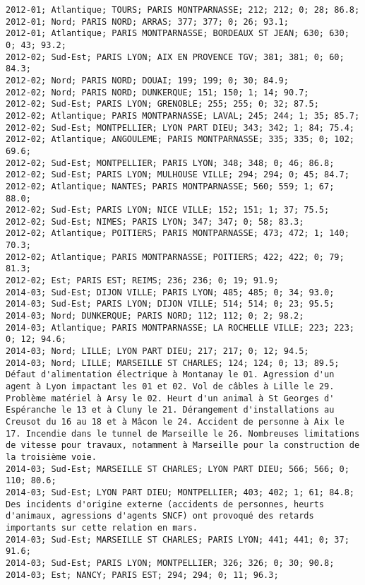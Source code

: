 \documentclass{article}
\begin{document}
\begin{Verbatim}[commandchars=\\\{\}]
2012-01; Atlantique; TOURS; PARIS MONTPARNASSE; 212; 212; 0; 28; 86.8; 
2012-01; Nord; PARIS NORD; ARRAS; 377; 377; 0; 26; 93.1; 
2012-01; Atlantique; PARIS MONTPARNASSE; BORDEAUX ST JEAN; 630; 630; 0; 43; 93.2; 
2012-02; Sud-Est; PARIS LYON; AIX EN PROVENCE TGV; 381; 381; 0; 60; 84.3; 
2012-02; Nord; PARIS NORD; DOUAI; 199; 199; 0; 30; 84.9; 
2012-02; Nord; PARIS NORD; DUNKERQUE; 151; 150; 1; 14; 90.7; 
2012-02; Sud-Est; PARIS LYON; GRENOBLE; 255; 255; 0; 32; 87.5; 
2012-02; Atlantique; PARIS MONTPARNASSE; LAVAL; 245; 244; 1; 35; 85.7; 
2012-02; Sud-Est; MONTPELLIER; LYON PART DIEU; 343; 342; 1; 84; 75.4; 
2012-02; Atlantique; ANGOULEME; PARIS MONTPARNASSE; 335; 335; 0; 102; 69.6; 
2012-02; Sud-Est; MONTPELLIER; PARIS LYON; 348; 348; 0; 46; 86.8; 
2012-02; Sud-Est; PARIS LYON; MULHOUSE VILLE; 294; 294; 0; 45; 84.7; 
2012-02; Atlantique; NANTES; PARIS MONTPARNASSE; 560; 559; 1; 67; 88.0; 
2012-02; Sud-Est; PARIS LYON; NICE VILLE; 152; 151; 1; 37; 75.5; 
2012-02; Sud-Est; NIMES; PARIS LYON; 347; 347; 0; 58; 83.3; 
2012-02; Atlantique; POITIERS; PARIS MONTPARNASSE; 473; 472; 1; 140; 70.3; 
2012-02; Atlantique; PARIS MONTPARNASSE; POITIERS; 422; 422; 0; 79; 81.3; 
2012-02; Est; PARIS EST; REIMS; 236; 236; 0; 19; 91.9; 
2014-03; Sud-Est; DIJON VILLE; PARIS LYON; 485; 485; 0; 34; 93.0; 
2014-03; Sud-Est; PARIS LYON; DIJON VILLE; 514; 514; 0; 23; 95.5; 
2014-03; Nord; DUNKERQUE; PARIS NORD; 112; 112; 0; 2; 98.2; 
2014-03; Atlantique; PARIS MONTPARNASSE; LA ROCHELLE VILLE; 223; 223; 0; 12; 94.6; 
2014-03; Nord; LILLE; LYON PART DIEU; 217; 217; 0; 12; 94.5; 
2014-03; Nord; LILLE; MARSEILLE ST CHARLES; 124; 124; 0; 13; 89.5; Défaut d'alimentation électrique à Montanay le 01. Agression d'un agent à Lyon impactant les 01 et 02. Vol de câbles à Lille le 29. Problème matériel à Arsy le 02. Heurt d'un animal à St Georges d' Espéranche le 13 et à Cluny le 21. Dérangement d'installations au Creusot du 16 au 18 et à Mâcon le 24. Accident de personne à Aix le 17. Incendie dans le tunnel de Marseille le 26. Nombreuses limitations de vitesse pour travaux, notamment à Marseille pour la construction de la troisième voie.
2014-03; Sud-Est; MARSEILLE ST CHARLES; LYON PART DIEU; 566; 566; 0; 110; 80.6; 
2014-03; Sud-Est; LYON PART DIEU; MONTPELLIER; 403; 402; 1; 61; 84.8; Des incidents d'origine externe (accidents de personnes, heurts d'animaux, agressions d'agents SNCF) ont provoqué des retards importants sur cette relation en mars.
2014-03; Sud-Est; MARSEILLE ST CHARLES; PARIS LYON; 441; 441; 0; 37; 91.6; 
2014-03; Sud-Est; PARIS LYON; MONTPELLIER; 326; 326; 0; 30; 90.8; 
2014-03; Est; NANCY; PARIS EST; 294; 294; 0; 11; 96.3; 

\end{Verbatim}
\end{document}
